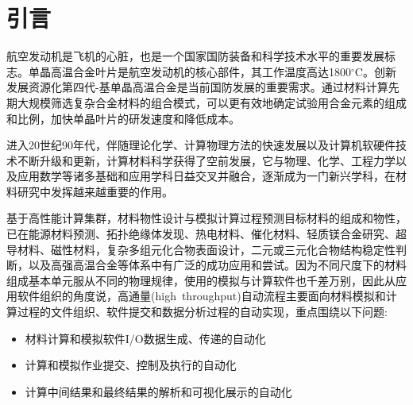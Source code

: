 \section{引言}
航空发动机是飞机的心脏，也是一个国家国防装备和科学技术水平的重要发展标志。单晶高温合金叶片是航空发动机的核心部件，其工作温度高达1800$^{\circ}\mathrm{C}$。创新发展资源化第四代-基单晶高温合金是当前国防发展的重要需求。通过材料计算先期大规模筛选复杂合金材料的组合模式，可以更有效地确定试验用合金元素的组成和比例，加快单晶叶片的研发速度和降低成本。

进入20世纪90年代，伴随理论化学、计算物理方法的快速发展以及计算机软硬件技术不断升级和更新，计算材料科学获得了空前发展，它与物理、化学、工程力学以及应用数学等诸多基础和应用学科日益交叉并融合，逐渐成为一门新兴学科，在材料研究中发挥越来越重要的作用。%

基于高性能计算集群，材料物性设计与模拟计算过程预测目标材料的组成和物性， 已在能源材料预测、拓扑绝缘体发现、热电材料、催化材料、轻质镁合金研究、超导材料、磁性材料，复杂多组元化合物表面设计，二元或三元化合物结构稳定性判断，以及高强高温合金等体系中有广泛的成功应用和尝试。因为不同尺度下的材料组成基本单元服从不同的物理规律，使用的模拟与计算软件也千差万别，因此从应用软件组织的角度说，高通量(\textrm{high~throughput})自动流程主要面向材料模拟和计算过程的文件组织、软件提交和数据分析过程的自动实现，重点围绕以下问题:~
\begin{itemize}
	\item 材料计算和模拟软件\textrm{I/O}数据生成、传递的自动化
	\item 计算和模拟作业提交、控制及执行的自动化
	\item 计算中间结果和最终结果的解析和可视化展示的自动化
\end{itemize}

